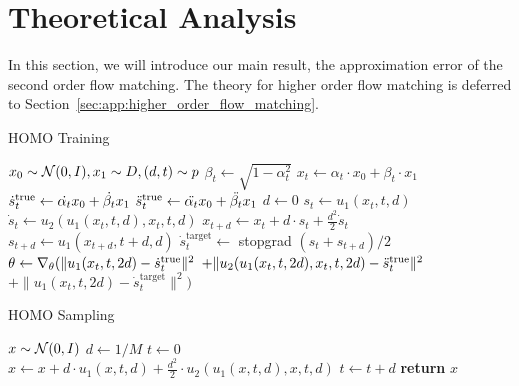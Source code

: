 
\section{Theoretical Analysis} \label{sec:main_result}


In this section, we will introduce our main result, the approximation error of the second order flow matching. The theory for higher order flow matching is deferred to Section~\ref{sec:app:higher_order_flow_matching}.

\begin{algorithm}[!ht]\caption{HOMO Training}
\begin{algorithmic}[1]
\State {}
\State {}
\State {}
\State {}
\State $x_0 \sim \mathcal{N} (0, I), x_1 \sim D, (d, t) \sim p$
\State $\beta_t \gets \sqrt{1-\alpha_t^2}$
\State $x_t \gets \alpha_t \cdot x_0 + \beta_t \cdot x_1$ 
\State $\dot s_t^{\mathrm{true}} \gets \dot{\alpha_t} x_0 + \dot{\beta_t} x_1$ 
\State $\ddot s_t^{\mathrm{true}} \gets \ddot{\alpha_t} x_0 + \ddot{\beta_t} x_1$ 
\State $d \gets 0$
\EndFor
{}
\State $s_t \gets u_1 ( x_t, t, d)$ 
\State $\dot s_t \gets u_2 (u_1 ( x_t, t, d), x_t, t, d)$ 
\State $x_{t + d} \gets x_t + d \cdot s_t + \frac{d^2}{2} \dot s_t $ 
\State $s_{t + d} \gets u_1 ( x_{t + d}, t + d, d )$ 
\State $\dot s_t^{\mathrm{target}} \gets$ stopgrad $(s_t + s_{t+d}) / 2$ 
\EndFor
\State $\theta \gets \nabla_\theta ( \| u_1 ( x_t, t, 2d ) - \dot s_t^{\mathrm{true}} \|^2$
\Statex \hspace{4.2em} $ + \| u_2 (u_1 (x_t, t, 2d), x_t, t, 2d) - \ddot s_t^{\mathrm{true}} \|^2$
\Statex \hspace{4.2em} $ + \| u_{1}(x_t, t, 2 d) - \dot{s}_t^{\mathrm{target}}\|^2)$
\EndWhile
\State \Return{$\theta$}
\EndProcedure
\end{algorithmic}
\end{algorithm}

\begin{algorithm}
[!ht]
\caption{HOMO Sampling}
\begin{algorithmic}[1]
\State {}
\State {}
\State $x \sim \mathcal{N} (0, I)$
\State $d \gets 1 / M$
\State $t \gets 0$
\State $x \gets x + d \cdot u_1 (x, t, d) + \frac{d^2}{2} \cdot u_2 (u_1 (x, t, d), x, t, d)$
\State $t \gets t + d$
\EndFor
\State \textbf{return} $x$
    \EndProcedure
\end{algorithmic}
\end{algorithm}



